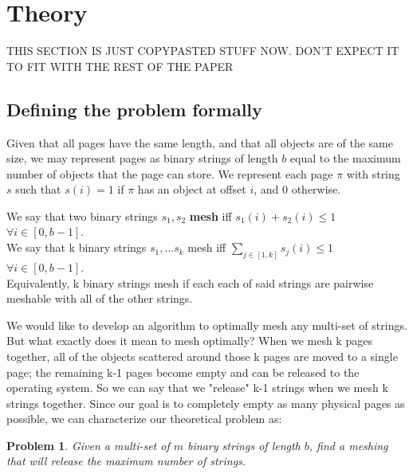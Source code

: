 \section{Theory}
\label{sec:theory}

THIS SECTION IS JUST COPYPASTED STUFF NOW. DON'T EXPECT IT TO FIT WITH THE REST OF THE PAPER

\newtheorem{problem}{Problem}

\newcommand{\bigo}{\mathcal{O}}
\newcommand{\page}{\pi}
\newcommand{\str}{s}
\newcommand{\node}{\mathcal {n}}
\newcommand{\W}{\mathcal {W}}

\subsection{Defining the problem formally}
Given that all pages have the same length, and that all objects are of the same size, we may represent pages as binary strings of length $b$ equal to the maximum number of objects that the page can store. We represent each page $\page$ with string $\str$ such that $\str(i) = 1$ if $\page$ has an object at offset $i$, and 0 otherwise.

\begin{definition}
We say that two binary strings $\str_{1}, \str_{2}$ \textbf{mesh}  iff $\str_{1}(i) + \str_{2}(i) \leq 1$ $\forall i \in [0,b-1]$.\\
We say that k binary strings $\str_{1}, ... \str_{k}$ mesh iff $\sum_{j \in [1,k]} \str_{j}(i) \leq 1$ $\forall i \in [0,b-1]$.\\
Equivalently, k binary strings mesh if each each of said strings are pairwise meshable with all of the other strings.
\end{definition}

We would like to develop an algorithm to optimally mesh any multi-set of strings.  But what exactly does it mean to mesh optimally?  When we mesh k pages together, all of the objects scattered around those k pages are moved to a single page; the remaining k-1 pages become empty and can be released to the operating system.  So we can say that we "release" k-1 strings when we mesh k strings together.  Since our goal is to completely empty as many physical pages as possible, we can characterize our theoretical problem as:

\begin{problem}
Given a multi-set of $m$ binary strings of length $b$, find a meshing that will release the maximum number of strings.
\end{problem}

